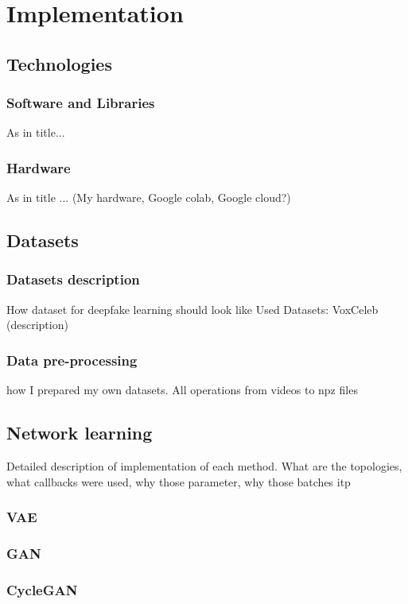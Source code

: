 \chapter{Implementation}
\section{Technologies}
\subsection{Software and Libraries}
As in title...

\subsection{Hardware}
As in title ... (My hardware, Google colab, Google cloud?)

\section{Datasets}
\subsection{Datasets description}
How dataset for deepfake learning should look like
Used Datasets: VoxCeleb (description)

\subsection{Data pre-processing}
 how I prepared my own datasets. All operations from videos to npz files

\section{Network learning}
Detailed description of implementation of each method. What are the topologies, what callbacks were used, why those parameter, why those batches itp
\subsection{VAE}
\subsection{GAN}
\subsection{CycleGAN}